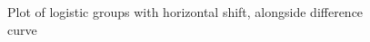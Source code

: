 \documentclass{article}
\begin{document}
\begin{figure}[H]
    \centering
    \caption{Plot of logistic groups with horizontal shift, alongside difference curve}
\label{fig:logistic_shift}
\end{figure}
\end{document}
